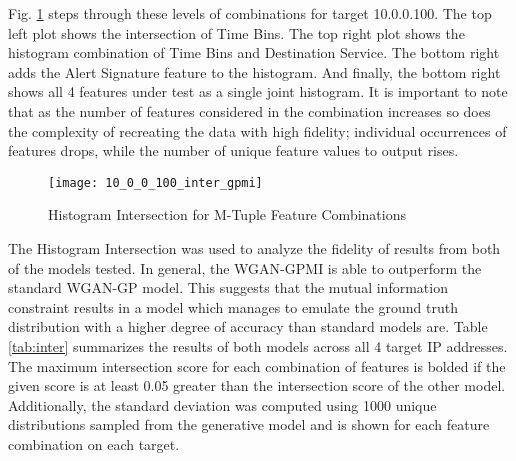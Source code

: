 Fig. \ref{fig:inter} steps through these levels of combinations for target 10.0.0.100. The top left plot shows the intersection of Time Bins. The top right plot shows the histogram combination of Time Bins and Destination Service. The bottom right adds the Alert Signature feature to the histogram. And finally, the bottom right shows all 4 features under test as a single joint histogram. It is important to note that as the number of features considered in the combination increases so does the complexity of recreating the data with high fidelity; individual occurrences of features drops, while the number of unique feature values to output rises.


\begin{figure}[!htbp]
	\centering
	\texttt{[image: 10\_0\_0\_100\_inter\_gpmi]}
	\caption{
		Histogram Intersection for M-Tuple Feature Combinations
	}
	\label{fig:inter}
\end{figure}

The Histogram Intersection was used to analyze the fidelity of results from both of the models tested. In general, the WGAN-GPMI is able to outperform the standard WGAN-GP model. This suggests that the mutual information constraint results in a model which manages to emulate the ground truth distribution with a higher degree of accuracy than standard models are. Table \ref{tab:inter} summarizes the results of both models across all 4 target IP addresses. The maximum intersection score for each combination of features is bolded if the given score is at least 0.05 greater than the intersection score of the other model. Additionally, the standard deviation was computed using 1000 unique distributions sampled from the generative model and is shown for each feature combination on each target. 

